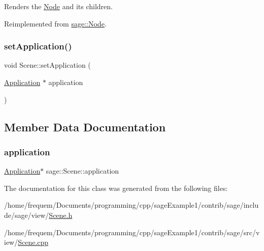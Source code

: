 Renders the \mbox{\hyperlink{classsage_1_1Node}{Node}} and its children. 



Reimplemented from \mbox{\hyperlink{classsage_1_1Node_ab93a6f41e02422a21c44227c0355382a}{sage\+::\+Node}}.

\mbox{\label{classsage_1_1Scene_a9c1362c9cef9cd8029f912d4003908c8}} 
\subsubsection{\texorpdfstring{setApplication()}{setApplication()}}
{\footnotesize\ttfamily void Scene\+::set\+Application (\begin{DoxyParamCaption}\item[{\mbox{\hyperlink{classsage_1_1Application}{Application}} $\ast$}]{application }\end{DoxyParamCaption})}



\subsection{Member Data Documentation}
\mbox{\label{classsage_1_1Scene_a06046ccc778f9e7257e777c048c481b9}} 
\subsubsection{\texorpdfstring{application}{application}}
{\footnotesize\ttfamily \mbox{\hyperlink{classsage_1_1Application}{Application}}$\ast$ sage\+::\+Scene\+::application\hspace{0.3cm}{\ttfamily [protected]}}



The documentation for this class was generated from the following files\+:\begin{DoxyCompactItemize}
\item 
/home/frequem/\+Documents/programming/cpp/sage\+Example1/contrib/sage/include/sage/view/\mbox{\hyperlink{Scene_8h}{Scene.\+h}}\item 
/home/frequem/\+Documents/programming/cpp/sage\+Example1/contrib/sage/src/view/\mbox{\hyperlink{Scene_8cpp}{Scene.\+cpp}}\end{DoxyCompactItemize}
